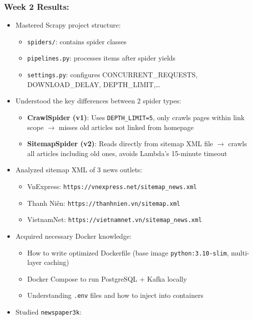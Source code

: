 \hypertarget{week-2-results}{%
\subsubsection{Week 2 Results:}}

\begin{itemize}
\tightlist
\item
  Mastered Scrapy project structure:

  \begin{itemize}
  \tightlist
  \item
    \texttt{spiders/}: contains spider classes
  \item
    \texttt{pipelines.py}: processes items after spider yields
  \item
    \texttt{settings.py}: configures CONCURRENT\_REQUESTS,
    DOWNLOAD\_DELAY, DEPTH\_LIMIT,\ldots{}
  \end{itemize}
\item
  Understood the key differences between 2 spider types:

  \begin{itemize}
  \tightlist
  \item
    \textbf{CrawlSpider (v1)}: Uses \texttt{DEPTH\_LIMIT=5}, only crawls
    pages within link scope \(\rightarrow\) misses old articles not
    linked from homepage
  \item
    \textbf{SitemapSpider (v2)}: Reads directly from sitemap XML file
    \(\rightarrow\) crawls all articles including old ones, avoids
    Lambda's 15-minute timeout
  \end{itemize}
\item
  Analyzed sitemap XML of 3 news outlets:

  \begin{itemize}
  \tightlist
  \item
    VnExpress: \texttt{https://vnexpress.net/sitemap\_news.xml}
  \item
    Thanh Niên: \texttt{https://thanhnien.vn/sitemap.xml}
  \item
    VietnamNet: \texttt{https://vietnamnet.vn/sitemap\_news.xml}
  \end{itemize}
\item
  Acquired necessary Docker knowledge:

  \begin{itemize}
  \tightlist
  \item
    How to write optimized Dockerfile (base image
    \texttt{python:3.10-slim}, multi-layer caching)
  \item
    Docker Compose to run PostgreSQL + Kafka locally
  \item
    Understanding \texttt{.env} files and how to inject into containers
  \end{itemize}
\item
  Studied \texttt{newspaper3k}:


\end{itemize}
